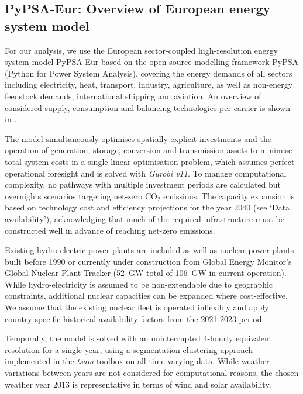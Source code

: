 

\subsection*{PyPSA-Eur: Overview of European energy system model}

For our analysis, we use the European sector-coupled high-resolution energy
system model PyPSA-Eur\cite{horschPyPSAEurOpen2018a} based on the open-source
modelling framework PyPSA\cite{brownPyPSAPython2018} (Python for Power System
Analysis), covering the energy demands of all sectors including electricity,
heat, transport, industry, agriculture, as well as non-energy feedstock demands,
international shipping and aviation. An overview of considered supply,
consumption and balancing technologies per carrier is shown in
.

The model simultaneously optimises spatially explicit investments and the 
operation of generation, storage, conversion and transmission assets to minimise
total system costs in a single linear optimisation problem, which assumes
perfect operational foresight and is solved with \textit{Gurobi 
v11}.\cite{gurobi} To manage computational complexity, no pathways with multiple
investment periods are calculated but overnights scenarios targeting net-zero
CO$_2$ emissions. The capacity expansion is based on technology cost and
efficiency projections for the year 2040 (see `Data availability'),
acknowledging that much of the required infrastructure must be constructed well
in advance of reaching net-zero emissions.

Existing hydro-electric power plants\cite{gotzensPerformingEnergy2019} are
included as well as nuclear power plants built before 1990 or currently under
construction from Global Energy Monitor's Global Nuclear Plant Tracker (52~GW
total of 106~GW in current
operation).\cite{globalenergymonitorGlobalNuclearPower2024} While
hydro-electricity is assumed to be non-extendable due to geographic constraints,
additional nuclear capacities can be expanded where cost-effective. We assume
that the existing nuclear fleet is operated inflexibly and apply
country-specific historical availability factors from the 2021-2023
period.\cite{internationalatomicenergyagencyPowerReactorInformation2024}

Temporally, the model is solved with an uninterrupted 4-hourly equivalent
resolution for a single year, using a segmentation clustering approach
implemented in the \textit{tsam} toolbox on all time-varying
data.\cite{hoffmannParetooptimalTemporal2022} While weather variations between
years are not considered for computational reasons, the chosen weather year 2013
is representative in terms of wind and solar
availability.\cite{gotskeDesigningSectorcoupledEuropean2024}

